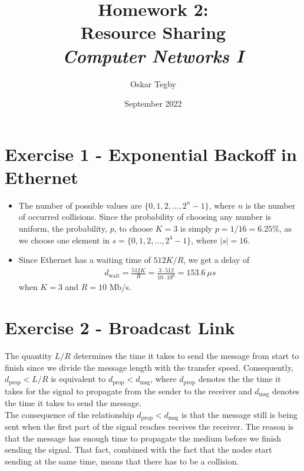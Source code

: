 \documentclass[10pt]{article}
\title{Homework 2: \\ Resource Sharing \\ \large \textit{Computer Networks I}}
\author{Oskar Tegby}
\date{September 2022}
\begin{document}
\maketitle


\section{Exercise 1 - Exponential Backoff in Ethernet}
\begin{itemize}
  \item The number of possible values are $\{0,1,2,\dots,2^n-1\}$, where $n$ is the number of occurred collisions. Since the probability of choosing any number is uniform, the probability, $p$, to choose $K=3$ is simply $p=1/16=6.25\%$, as we choose one element in $s=\{0,1,2,\dots,2^4-1\}$, where $|s|=16$. 
  \item Since Ethernet has a waiting time of $512K/R$, we get a delay of
  \begin{align*}
    d_\text{wait}=\frac{512K}{R}=\frac{3\cdot512}{10\cdot10^6}=153.6\ \mu s
  \end{align*}
  when $K=3$ and $R=10$ Mb/s. 
\end{itemize}
\section{Exercise 2 - Broadcast Link}
The quantity $L/R$ determines the time it takes to send the message from start to finish since we divide the message length with the transfer speed. Consequently, $d_\text{prop}<L/R$ is equivalent to $d_\text{prop}<d_\text{msg}$, where $d_\text{prop}$ denotes the the time it takes for the signal to propagate from the sender to the receiver and $d_\text{msg}$ denotes the time it takes to send the message. \\

The consequence of the relationship $d_\text{prop}<d_\text{msg}$ is that the message still is being sent when the first part of the signal reaches receives the receiver. The reason is that the message has enough time to propagate the medium before we finish sending the signal. That fact, combined with the fact that the nodes start sending at the same time, means that there has to be a collision. \\
\end{document}
